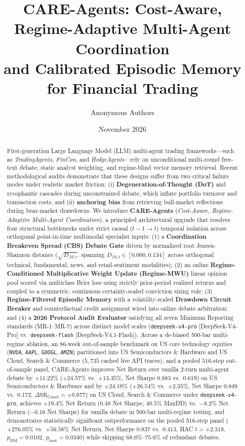 \documentclass[10pt,a4paper,twocolumn]{article}
\title{\vspace{-8mm}\textbf{\Large CARE-Agents: Cost-Aware, Regime-Adaptive Multi-Agent Coordination\\and Calibrated Episodic Memory for Financial Trading}}
\author{Anonymous Authors}
\date{\vspace{-3mm}\small November 2026}
\begin{document}
\maketitle

\begin{abstract}
\noindent
First-generation Large Language Model (LLM) multi-agent trading frameworks---such as \textit{TradingAgents}, \textit{FinCon}, and \textit{HedgeAgents}---rely on unconditional multi-round free-text debate, static analyst weighting, and regime-blind vector memory retrieval. Recent methodological audits demonstrate that these designs suffer from two critical failure modes under realistic market friction: (i) \textbf{Degeneration-of-Thought (DoT)} and sycophantic cascades during unconstrained debate, which inflate portfolio turnover and transaction costs, and (ii) \textbf{anchoring bias} from retrieving bull-market reflections during bear-market drawdowns. We introduce \textbf{CARE-Agents} (\textit{Cost-Aware, Regime-Adaptive Multi-Agent Coordination}), a principled architectural upgrade that resolves four structural bottlenecks under strict causal ($t-1 \to t$) temporal isolation across orthogonal point-in-time multimodal specialist inputs: (1) a \textbf{Coordination Breakeven Spread (CBS) Debate Gate} driven by normalized root Jensen-Shannon distance ($\sqrt{D_{JS,t}}$, spanning $D_{JS,t} \in [0.000, 0.134]$ across orthogonal technical, fundamental, news, and retail-sentiment modalities); (2) an online \textbf{Regime-Conditioned Multiplicative Weight Update (Regime-MWU)} linear opinion pool scored via multiclass Brier loss using strictly prior-period realized returns and coupled to a symmetric, continuous certainty-scaled conviction sizing rule; (3) \textbf{Regime-Filtered Episodic Memory} with a volatility-scaled \textbf{Drawdown Circuit Breaker} and counterfactual credit assignment wired into online debate arbitration; and (4) a \textbf{2026 Protocol Audit Evaluator} satisfying all seven Minimum Reporting standards (MR-1--MR-7) across distinct model scales (\texttt{deepseek-v4-pro} [DeepSeek-V4-Pro] vs.\ \texttt{deepseek-flash} [DeepSeek-V4.1-Flash]). Across a de-biased 500-bar multi-regime ablation, an 86-week out-of-sample benchmark on US core technology equities (\texttt{NVDA}, \texttt{AAPL}, \texttt{GOOGL}, \texttt{AMZN}) partitioned into US Semiconductors \& Hardware and US Cloud, Search \& Commerce ($5,735$ cached live API traces), and a pooled $516$-step out-of-sample panel, CARE-Agents improves Net Return over vanilla 2-turn multi-agent debate by $+11.22\%$ ($+24.57\%$ vs.\ $+13.35\%$, Net Sharpe $0.883$ vs.\ $0.619$) on US Semiconductors \& Hardware and by $+24.19\%$ ($+26.54\%$ vs.\ $+2.35\%$, Net Sharpe $0.849$ vs.\ $0.172$, $\Delta\text{SR}_{\text{Coord}} = +0.677$) on US Cloud, Search \& Commerce under \texttt{deepseek-v4-pro}, achieves $+19.4\%$ Net Return ($0.48$ Net Sharpe, $40.5\%$ MaxDD) vs.\ $-8.2\%$ Net Return ($-0.16$ Net Sharpe) for vanilla debate in 500-bar multi-regime testing, and demonstrates statistically significant outperformance on the pooled 516-step panel ($+276.05\%$ vs.\ $+56.58\%$ Net Return, Net Sharpe $0.837$ vs.\ $0.413$, HAC $t = +2.318$, $p_{\text{DM}} = 0.0102$, $p_{\text{boot}} = 0.0340$) while skipping $68.6\%$--$75.6\%$ of redundant debates. 
\end{abstract}
\end{document}
